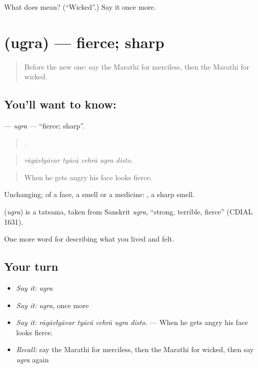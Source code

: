 \begin{tcolorbox}[breakable,colback=teal!4,colframe=teal!35!black,title={Before you move on}]
What does  mean? (\textquotedblleft{}Wicked\textquotedblright{}.) Say it once more.
\end{tcolorbox}
\section[\texorpdfstring{\mr{उग्र} (ugra)}{उग्र (ugra)}]{ (ugra) — fierce; sharp}

\label{lesson:MR-C469-ugra}



\begin{quote}
Before the new one: say the Marathi for merciless, then the Marathi for wicked.
\end{quote}

\subsection*{You'll want to know: }
\textbf{} — \emph{ugra} — \textquotedblleft{}fierce; sharp\textquotedblright{}.

\begin{quote}
    .
\end{quote}

\begin{quote}
\emph{rāgāvlyāvar tyācā cehrā ugra disto.}
\end{quote}

\begin{quote}
When he gets angry his face looks fierce.
\end{quote}

Unchanging; of a face, a smell or a medicine:  , a sharp smell.

\begin{cousinweb}
\textbf{} (\emph{ugra}) is a tatsama, taken from Sanskrit \emph{ugra}, \textquotedblleft{}strong, terrible, fierce\textquotedblright{} (CDIAL 1631).
\end{cousinweb}

\begin{grammarlens}[title={What you've built}]
One more word for describing what you lived and felt.
\end{grammarlens}

\subsection*{Your turn}
\begin{itemize}
\raggedright
  \item \emph{Say it:} \emph{ugra}
  \item \emph{Say it:} \emph{ugra}, once more
  \item \emph{Say it:} \emph{rāgāvlyāvar tyācā cehrā ugra disto.} — When he gets angry his face looks fierce.
  \item \emph{Recall:} say the Marathi for merciless, then the Marathi for wicked, then say \emph{ugra} again
\end{itemize}

